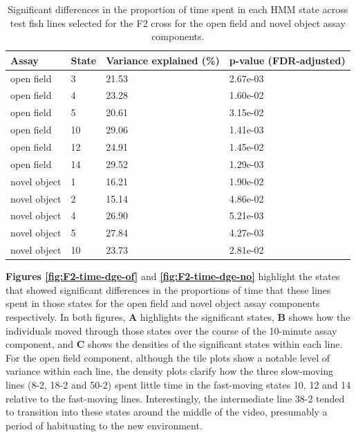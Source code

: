 \documentclass[
]{article}
\begin{document}
\begin{table}

\caption{\label{tab:mikk-dge-F0}Significant differences in the proportion of time spent in each HMM state across test fish lines selected for the F2 cross for the open field and novel object assay components.}
\centering
\begin{tabular}[t]{l|l|l|l}
\hline
Assay & State & Variance explained (\%) & p-value (FDR-adjusted)\\
\hline
open field & 3 & 21.53 & 2.67e-03\\
\hline
open field & 4 & 23.28 & 1.60e-02\\
\hline
open field & 5 & 20.61 & 3.15e-02\\
\hline
open field & 10 & 29.06 & 1.41e-03\\
\hline
open field & 12 & 24.91 & 1.45e-02\\
\hline
open field & 14 & 29.52 & 1.29e-03\\
\hline
novel object & 1 & 16.21 & 1.90e-02\\
\hline
novel object & 2 & 15.14 & 4.86e-02\\
\hline
novel object & 4 & 26.90 & 5.21e-03\\
\hline
novel object & 5 & 27.84 & 4.27e-03\\
\hline
novel object & 10 & 23.73 & 2.81e-02\\
\hline
\end{tabular}
\end{table}

\textbf{Figures \ref{fig:F2-time-dge-of}} and \textbf{\ref{fig:F2-time-dge-no}} highlight the states that showed significant differences in the proportions of time that these lines spent in those states for the open field and novel object assay components respectively. In both figures, \textbf{A} highlights the significant states, \textbf{B} shows how the individuals moved through those states over the course of the 10-minute assay component, and \textbf{C} shows the densities of the significant states within each line. For the open field component, although the tile plots show a notable level of variance within each line, the density plots clarify how the three slow-moving lines (8-2, 18-2 and 50-2) spent little time in the fast-moving states 10, 12 and 14 relative to the fast-moving lines. Interestingly, the intermediate line 38-2 tended to transition into these states around the middle of the video, presumably a period of habituating to the new environment.
\end{document}
